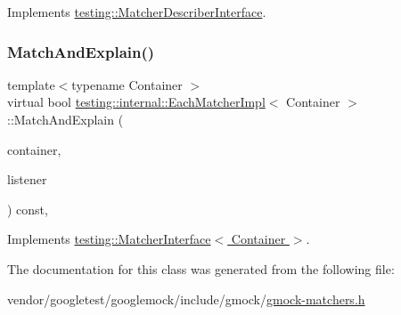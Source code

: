 Implements \hyperlink{classtesting_1_1_matcher_describer_interface_ad9f861588bd969b6e3e717f13bb94e7b}{testing\+::\+Matcher\+Describer\+Interface}.

\mbox{\label{classtesting_1_1internal_1_1_each_matcher_impl_a3b8ca89c85a96bbbcc74196ad29bf1ec}} 
\subsubsection{\texorpdfstring{Match\+And\+Explain()}{MatchAndExplain()}}
{\footnotesize\ttfamily template$<$typename Container $>$ \\
virtual bool \hyperlink{classtesting_1_1internal_1_1_each_matcher_impl}{testing\+::internal\+::\+Each\+Matcher\+Impl}$<$ Container $>$\+::Match\+And\+Explain (\begin{DoxyParamCaption}\item[{Container}]{container,  }\item[{\hyperlink{classtesting_1_1_match_result_listener}{Match\+Result\+Listener} $\ast$}]{listener }\end{DoxyParamCaption}) const\hspace{0.3cm}{\ttfamily [inline]}, {\ttfamily [virtual]}}



Implements \hyperlink{classtesting_1_1_matcher_interface_a296b43607cd99d60365f0e6a762777cf}{testing\+::\+Matcher\+Interface$<$ Container $>$}.



The documentation for this class was generated from the following file\+:\begin{DoxyCompactItemize}
\item 
vendor/googletest/googlemock/include/gmock/\hyperlink{gmock-matchers_8h}{gmock-\/matchers.\+h}\end{DoxyCompactItemize}
